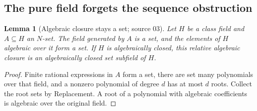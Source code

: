 \documentclass[11pt,letterpaper]{article}
\numberwithin{equation}{section}
\newtheorem{lemma}[lemma]{Lemma}
\theoremstyle{definition}
\theoremstyle{remark}
\begin{document}
\subsection{The pure field forgets the sequence obstruction}

\begin{lemma}[Algebraic closure stays a set; source 03]\label{univ:lem:algebraicset}
Let $H$ be a class field and $A\subseteq H$ an $N$-set. The field generated by
$A$ is a set, and the elements of $H$ algebraic over it form a set. If $H$ is
algebraically closed, this relative algebraic closure is an algebraically
closed set subfield of $H$.
\end{lemma}
\begin{proof}
Finite rational expressions in $A$ form a set, there are set many polynomials
over that field, and a nonzero polynomial of degree $d$ has at most $d$ roots.
Collect the root sets by Replacement. A root of a polynomial with algebraic
coefficients is algebraic over the original field.
\end{proof}
\end{document}
